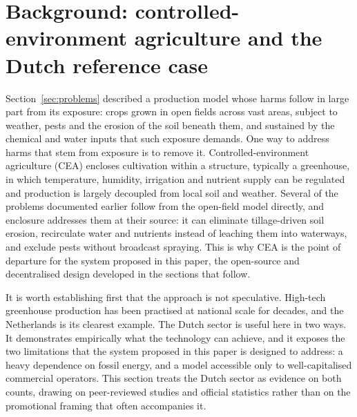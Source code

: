 \section{Background: controlled-environment agriculture and the Dutch reference case}

Section~\ref{sec:problems} described a production model whose harms follow in large part from its exposure: crops grown in open fields across vast areas, subject to weather, pests and the erosion of the soil beneath them, and sustained by the chemical and water inputs that such exposure demands. One way to address harms that stem from exposure is to remove it. Controlled-environment agriculture (CEA) encloses cultivation within a structure, typically a greenhouse, in which temperature, humidity, irrigation and nutrient supply can be regulated and production is largely decoupled from local soil and weather. Several of the problems documented earlier follow from the open-field model directly, and enclosure addresses them at their source: it can eliminate tillage-driven soil erosion, recirculate water and nutrients instead of leaching them into waterways, and exclude pests without broadcast spraying. This is why CEA is the point of departure for the system proposed in this paper, the open-source and decentralised design developed in the sections that follow.

It is worth establishing first that the approach is not speculative. High-tech greenhouse production has been practised at national scale for decades, and the Netherlands is its clearest example. The Dutch sector is useful here in two ways. It demonstrates empirically what the technology can achieve, and it exposes the two limitations that the system proposed in this paper is designed to address: a heavy dependence on fossil energy, and a model accessible only to well-capitalised commercial operators. This section treats the Dutch sector as evidence on both counts, drawing on peer-reviewed studies and official statistics rather than on the promotional framing that often accompanies it.

